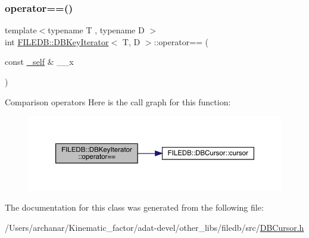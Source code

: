 \subsubsection{\texorpdfstring{operator==()}{operator==()}\hspace{0.1cm}{\footnotesize\ttfamily [3/3]}}
{\footnotesize\ttfamily template$<$typename T , typename D $>$ \\
int \mbox{\hyperlink{classFILEDB_1_1DBKeyIterator}{F\+I\+L\+E\+D\+B\+::\+D\+B\+Key\+Iterator}}$<$ T, D $>$\+::operator== (\begin{DoxyParamCaption}\item[{const \mbox{\hyperlink{classFILEDB_1_1DBKeyIterator_aaf7773c7a848ec6e04bc738dd794ace1}{\+\_\+self}} \&}]{\+\_\+\+\_\+x }\end{DoxyParamCaption})\hspace{0.3cm}{\ttfamily [inline]}}

Comparison operators Here is the call graph for this function\+:
\nopagebreak
\begin{figure}[H]
\begin{center}
\leavevmode
\includegraphics[width=350pt]{d4/d89/classFILEDB_1_1DBKeyIterator_ab6d1aad1d07c4ee9a1edeadf6610c6f4_cgraph}
\end{center}
\end{figure}


The documentation for this class was generated from the following file\+:\begin{DoxyCompactItemize}
\item 
/\+Users/archanar/\+Kinematic\+\_\+factor/adat-\/devel/other\+\_\+libs/filedb/src/\mbox{\hyperlink{adat-devel_2other__libs_2filedb_2src_2DBCursor_8h}{D\+B\+Cursor.\+h}}\end{DoxyCompactItemize}
